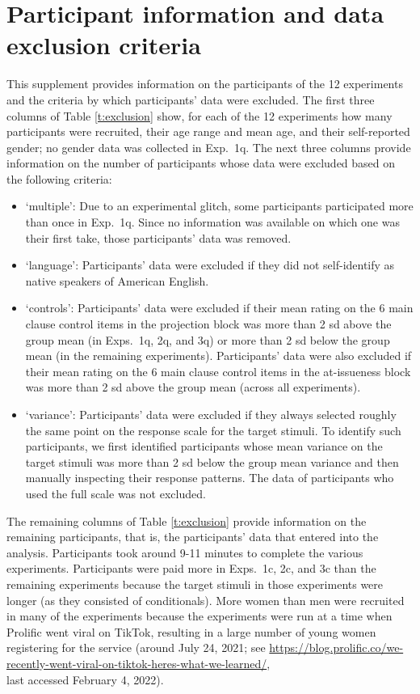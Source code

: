 \documentclass[11pt,fleqn]{article}
\newcommand{\6}{\mbox{$[\hspace*{-.6mm}[$}}
\newcommand{\9}{\mbox{$]\hspace*{-.6mm}]$}}
\begin{document}
\section{Participant information and data exclusion criteria}\label{a-participants}

This supplement provides information on the participants of the 12 experiments and the criteria by which participants' data were excluded. The first three columns of Table \ref{t:exclusion} show, for each of the 12 experiments how many participants were recruited, their age range and mean age, and their self-reported gender; no gender data was collected in Exp.~1q. The next three columns provide information on the number of participants whose data were excluded based on the following criteria:

\begin{itemize}[itemsep=-2pt]

\item `multiple': Due to an experimental glitch, some participants participated more than once in Exp.~1q. Since no information was available on which one was their first take, those participants' data was removed. 

\item `language': Participants' data were excluded if they did not self-identify as native speakers of American English.

\item `controls': Participants' data were excluded if their mean rating on the 6 main clause control items in the projection block was more than 2 sd above the group mean (in Exps.~1q, 2q, and 3q) or more than 2 sd below the group mean (in the remaining experiments). Participants' data were also excluded if their mean rating on the 6 main clause control items in the at-issueness block was more than 2 sd above the group mean (across all experiments).
 
\item `variance': Participants' data were excluded if they always selected roughly the same point on the response scale for the target stimuli. To identify such participants, we first identified participants whose mean variance on the target stimuli was more than 2 sd below the group mean variance and then manually inspecting their response patterns. The data of participants who used the full scale was not excluded.  
\end{itemize}

The remaining columns of Table \ref{t:exclusion} provide information on the remaining participants, that is, the participants' data that entered into the analysis. Participants took around 9-11 minutes to complete the various experiments. Participants were paid more in Exps.~1c, 2c, and 3c than the remaining experiments because the target stimuli in those experiments were longer (as they consisted of conditionals). More women than men were recruited in many of the experiments because the experiments were run at a time when Prolific went viral on TikTok, resulting in a large number of young women registering for the service (around July 24, 2021; see \url{https://blog.prolific.co/we-recently-went-viral-on-tiktok-heres-what-we-learned/}, \\ last accessed February 4, 2022).  

 
\end{document}

